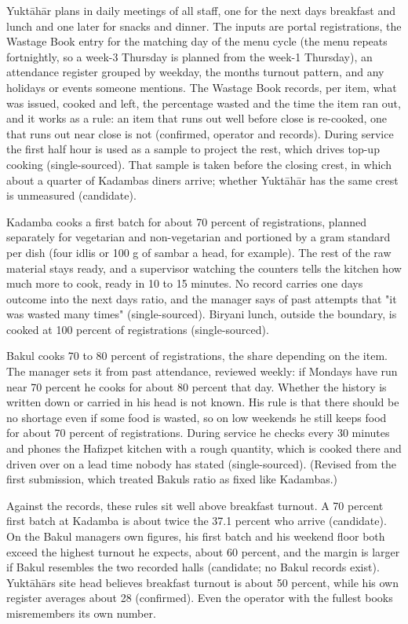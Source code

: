 \documentclass[
  10pt,
  table]{article}
\begin{document}
Yuktāhār plans in daily meetings of all staff, one for the next day\textquotesingle s breakfast and lunch and one later for snacks and dinner. The inputs are portal registrations, the Wastage Book entry for the matching day of the menu cycle (the menu repeats fortnightly, so a week-3 Thursday is planned from the week-1 Thursday), an attendance register grouped by weekday, the month\textquotesingle s turnout pattern, and any holidays or events someone mentions. The Wastage Book records, per item, what was issued, cooked and left, the percentage wasted and the time the item ran out, and it works as a rule: an item that runs out well before close is re-cooked, one that runs out near close is not (confirmed, operator and records). During service the first half hour is used as a sample to project the rest, which drives top-up cooking (single-sourced). That sample is taken before the closing crest, in which about a quarter of Kadamba\textquotesingle s diners arrive; whether Yuktāhār has the same crest is unmeasured (candidate).

Kadamba cooks a first batch for about 70 percent of registrations, planned separately for vegetarian and non-vegetarian and portioned by a gram standard per dish (four idlis or 100 g of sambar a head, for example). The rest of the raw material stays ready, and a supervisor watching the counters tells the kitchen how much more to cook, ready in 10 to 15 minutes. No record carries one day\textquotesingle s outcome into the next day\textquotesingle s ratio, and the manager says of past attempts that "it was wasted many times" (single-sourced). Biryani lunch, outside the boundary, is cooked at 100 percent of registrations (single-sourced).

Bakul cooks 70 to 80 percent of registrations, the share depending on the item. The manager sets it from past attendance, reviewed weekly: if Mondays have run near 70 percent he cooks for about 80 percent that day. Whether the history is written down or carried in his head is not known. His rule is that there should be no shortage even if some food is wasted, so on low weekends he still keeps food for about 70 percent of registrations. During service he checks every 30 minutes and phones the Hafizpet kitchen with a rough quantity, which is cooked there and driven over on a lead time nobody has stated (single-sourced). (Revised from the first submission, which treated Bakul\textquotesingle s ratio as fixed like Kadamba\textquotesingle s.)

Against the records, these rules sit well above breakfast turnout. A 70 percent first batch at Kadamba is about twice the 37.1 percent who arrive (candidate). On the Bakul manager\textquotesingle s own figures, his first batch and his weekend floor both exceed the highest turnout he expects, about 60 percent, and the margin is larger if Bakul resembles the two recorded halls (candidate; no Bakul records exist). Yuktāhār\textquotesingle s site head believes breakfast turnout is about 50 percent, while his own register averages about 28 (confirmed). Even the operator with the fullest books misremembers its own number.
\end{document}
